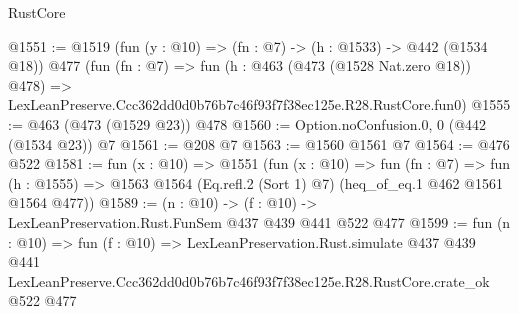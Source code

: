 \begin{lexlean}{RustCore}
\begin{coremodule}
@1551 := @1519
    (fun (y : @10) => (fn : @7) -> (h : @1533) -> @442 (@1534 @18))
    @477
    (fun (fn : @7) =>
    fun (h : @463 (@473 (@1528 Nat.zero @18)) @478) =>
    LexLeanPreserve.Ccc362dd0d0b76b7c46f93f7f38ec125e.R28.RustCore.fun0)
@1555 := @463 (@473 (@1529 @23)) @478
@1560 := Option.noConfusion.{0, 0} (@442 (@1534 @23)) @7
@1561 := @208 @7
@1563 := @1560 @1561 @7
@1564 := @476 @522
@1581 := fun (x : @10) =>
  @1551
    (fun (x : @10) =>
    fun (fn : @7) =>
    fun (h : @1555) => @1563 @1564 (Eq.refl.{2} (Sort 1) @7) (heq_of_eq.{1} @462 @1561 @1564 @477))
@1589 := (n : @10) -> (f : @10) -> LexLeanPreservation.Rust.FunSem @437 @439 @441 @522 @477
@1599 := fun (n : @10) =>
  fun (f : @10) =>
  LexLeanPreservation.Rust.simulate
    @437
    @439
    @441
    LexLeanPreserve.Ccc362dd0d0b76b7c46f93f7f38ec125e.R28.RustCore.crate_ok
    @522
    @477
\end{coremodule}
\end{lexlean}
